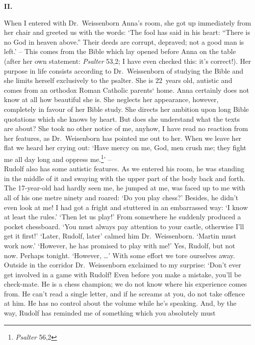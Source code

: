 \begin {center} 
{\bf II.} 
\end {center} 
When I entered with Dr.~Weissenborn Anna's room, she got up immediately from her 
chair and greeted us with the words: `The fool has said in his heart: ``There is no 
God in heaven above.'' Their deeds are corrupt, depraved; not a good man is left.'
-- This comes from the Bible which lay opened before Anna on the table (after her 
own statement: {\em Psalter\/} 53,2; I have even checked this: it's correct!). 
Her purpose in life consists according to Dr.~Weissenborn of studying the Bible 
and she limits herself exclusively to the psalter. 
She is 22~years old, autistic and comes from an orthodox Roman Catholic parents` home. 
Anna certainly does not know at all how beautiful she is. 
She neglects her appearance, however, completely in favour of her Bible study. 
She directs her ambition upon long Bible quotations which she knows by heart. 
But does she understand what the texts are about? 
She took no other notice of me, anyhow, I have read no reaction from her features, as Dr.~Weisenborn has pointed me out to her. 
When we leave her flat we heard her crying out: `Have mercy on me, God, men crush me; they 
fight me all day long and oppress me.\footnote {{\em Psalter\/} 56,2}' -- \\ 
Rudolf also has some autistic features. 
As we entered his room, he was standing in the middle of it and swaying with the 
upper part of the body back and forth. 
The 17-year-old had hardly seen me, he jumped at me, was faced up to me with all of 
his one metre ninety and roared: `Do you play chess?' 
Besides, he didn't even look at me! 
I had got a fright and stuttered in an embarrassed way: 
`I know at least the rules.' `Then let us play!' 
From somewhere he suddenly produced a pocket chessboard. 
`You must always pay attention to your castle, otherwise I'll get it first!' 
`Later, Rudolf, later' calmed him Dr.~Weissenborn. `Martin must work now.'
`However, he has promised to play with me!' Yes, Rudolf, but not now. Perhaps 
tonight. `However, \dots' 
With some effort we tore ourselves away. 
Outside in the corridor Dr.~Weissenborn exclaimed to my surprise: `Don't ever get 
involved in a game with Rudolf! Even before you make a mistake, you'll be check-mate. 
He is a chess champion; we do not know where his experience comes from. 
He can't read a single letter, and if he screams at you, do not take offence at him. 
He has no control about the volume while he's speaking. 
And, by the way, Rudolf has reminded me of something which you absolutely must 
